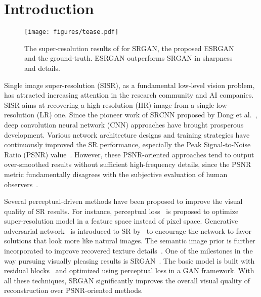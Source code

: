 \documentclass[runningheads]{llncs}
\begin{document}
\section{Introduction}

\begin{figure}[htbp]
	\begin{center}
		\texttt{[image: figures/tease.pdf]}
	\end{center}
	\vspace{-0.4cm}
	\caption{The super-resolution results of  for SRGAN\protect\footnotemark, the proposed ESRGAN and the 
		ground-truth. ESRGAN outperforms SRGAN in sharpness and details.}
	\vspace{-0.4cm}
	\label{fig:tease}
\end{figure}

Single image super-resolution (SISR), as a fundamental low-level vision problem, has attracted increasing attention in 
the research community and AI companies.
SISR aims at recovering a high-resolution (HR) image from a single low-resolution (LR) one.
Since the pioneer work of SRCNN proposed by Dong et al.~\cite{dong2014learning}, deep convolution neural network 
(CNN) approaches have brought prosperous development.
Various network architecture designs and training strategies have continuously improved the SR performance, especially 
the Peak Signal-to-Noise Ratio (PSNR) 
value~\cite{kim2016accurate,lai2017deep,kim2016deeply,ledig2017photo,tai2017image,tai2017memnet,haris2018deep,zhang2018residual,zhang2018image}.
However, these PSNR-oriented approaches tend to output over-smoothed results without sufficient high-frequency details, 
since the PSNR metric fundamentally disagrees with the subjective evaluation of human observers~\cite{ledig2017photo}.

Several perceptual-driven methods have been proposed to improve the visual quality of SR results.
For instance, perceptual loss~\cite{johnson2016perceptual,bruna2015super} is proposed to optimize super-resolution 
model in a feature space instead of pixel space. 
Generative adversarial network~\cite{goodfellow2014generative} is introduced to SR 
by~\cite{ledig2017photo,sajjadi2017enhancenet} to encourage the network to favor solutions that look more like natural 
images.
The semantic image prior is further incorporated to improve recovered texture details~\cite{wang2018sftgan}.
One of the milestones in the way pursuing visually pleasing results is SRGAN~\cite{ledig2017photo}.
The basic model is built with residual blocks~\cite{he2016deep} and optimized using perceptual loss in a GAN framework.
With all these techniques, SRGAN significantly improves the overall visual quality of reconstruction over PSNR-oriented 
methods.
\end{document}
